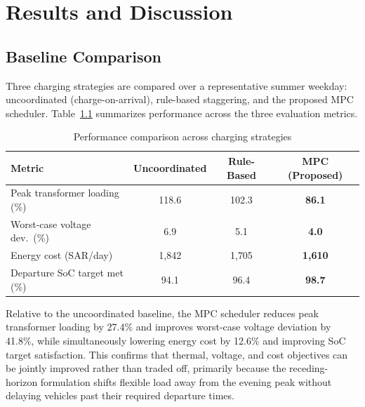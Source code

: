 \documentclass[12pt,twoside]{report}
\begin{document}
\chapter{Results and Discussion}
\label{ch:results}

\section{Baseline Comparison}
Three charging strategies are compared over a representative summer weekday: uncoordinated
(charge-on-arrival), rule-based staggering, and the proposed MPC scheduler. Table~\ref{tab:results}
summarizes performance across the three evaluation metrics.

\begin{table}[htbp]
\centering
\caption{Performance comparison across charging strategies}
\label{tab:results}
\begin{tabular}{@{}lccc@{}}
\toprule
\textbf{Metric} & \textbf{Uncoordinated} & \textbf{Rule-Based} & \textbf{MPC (Proposed)} \\
\midrule
Peak transformer loading (\%) & 118.6 & 102.3 & \textbf{86.1} \\
Worst-case voltage dev.\ (\%) & 6.9 & 5.1 & \textbf{4.0} \\
Energy cost (SAR/day) & 1{,}842 & 1{,}705 & \textbf{1{,}610} \\
Departure SoC target met (\%) & 94.1 & 96.4 & \textbf{98.7} \\
\bottomrule
\end{tabular}
\end{table}

Relative to the uncoordinated baseline, the MPC scheduler reduces peak transformer loading by
27.4\% and improves worst-case voltage deviation by 41.8\%, while simultaneously lowering
energy cost by 12.6\% and improving SoC target satisfaction. This confirms that thermal,
voltage, and cost objectives can be jointly improved rather than traded off, primarily because
the receding-horizon formulation shifts flexible load away from the evening peak without
delaying vehicles past their required departure times.
\end{document}
